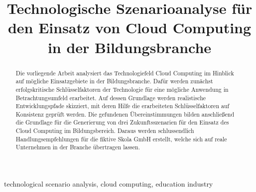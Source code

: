 \documentclass[conference]{IEEEtran}
\begin{document}
\title{Technologische Szenarioanalyse für den Einsatz von Cloud Computing in der Bildungsbranche}

\author{
}

\maketitle

\begin{abstract}
Die vorliegende Arbeit analysiert das Technologiefeld Cloud Computing im Hinblick auf mögliche Einsatzgebiete in der Bildungsbranche. Dafür werden zunächst erfolgskritische Schlüsselfaktoren der Technologie für eine mögliche Anwendung in Betrachtungsumfeld erarbeitet. Auf dessen Grundlage werden realistische Entwicklungspfade skizziert, mit deren Hilfe die erarbeiteten Schlüsselfaktoren auf Konsistenz geprüft werden. Die gefundenen Übereinstimmungen bilden anschließend die Grundlage für die Generierung von drei Zukunftsszenarien für den Einsatz des Cloud Computing im Bildungsbereich. Daraus werden schlussendlich Handlungsempfehlungen für die fiktive Skola GmbH erstellt, welche sich auf reale Unternehmen in der Branche übertragen lassen.
\end{abstract}

\begin{IEEEkeywords}
technological scenario analysis, cloud computing, education industry
\end{IEEEkeywords}

\end{document}
